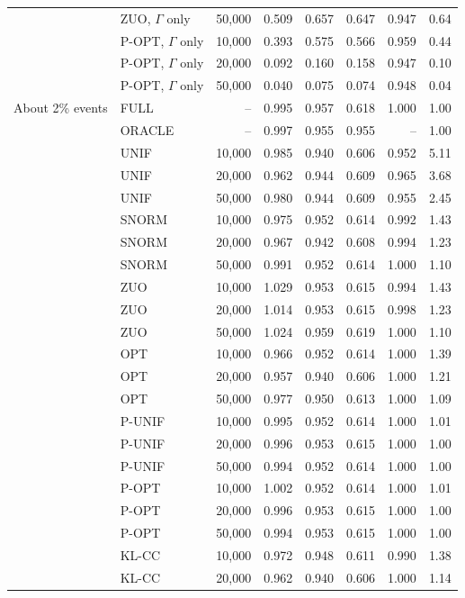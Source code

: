 \begin{tabular}{llrrrrrr}
 & ZUO, \(\Gamma\) only & 50,000 & 0.509 & 0.657 & 0.647 & 0.947 & 0.64\\
 & P-OPT, \(\Gamma\) only & 10,000 & 0.393 & 0.575 & 0.566 & 0.959 & 0.44\\
 & P-OPT, \(\Gamma\) only & 20,000 & 0.092 & 0.160 & 0.158 & 0.947 & 0.10\\
 & P-OPT, \(\Gamma\) only & 50,000 & 0.040 & 0.075 & 0.074 & 0.948 & 0.04\\
\addlinespace
About 2\% events & FULL & -- & 0.995 & 0.957 & 0.618 & 1.000 & 1.00\\
 & ORACLE & -- & 0.997 & 0.955 & 0.955 & -- & 1.00\\
 & UNIF & 10,000 & 0.985 & 0.940 & 0.606 & 0.952 & 5.11\\
 & UNIF & 20,000 & 0.962 & 0.944 & 0.609 & 0.965 & 3.68\\
 & UNIF & 50,000 & 0.980 & 0.944 & 0.609 & 0.955 & 2.45\\
 & SNORM & 10,000 & 0.975 & 0.952 & 0.614 & 0.992 & 1.43\\
 & SNORM & 20,000 & 0.967 & 0.942 & 0.608 & 0.994 & 1.23\\
 & SNORM & 50,000 & 0.991 & 0.952 & 0.614 & 1.000 & 1.10\\
 & ZUO & 10,000 & 1.029 & 0.953 & 0.615 & 0.994 & 1.43\\
 & ZUO & 20,000 & 1.014 & 0.953 & 0.615 & 0.998 & 1.23\\
 & ZUO & 50,000 & 1.024 & 0.959 & 0.619 & 1.000 & 1.10\\
 & OPT & 10,000 & 0.966 & 0.952 & 0.614 & 1.000 & 1.39\\
 & OPT & 20,000 & 0.957 & 0.940 & 0.606 & 1.000 & 1.21\\
 & OPT & 50,000 & 0.977 & 0.950 & 0.613 & 1.000 & 1.09\\
 & P-UNIF & 10,000 & 0.995 & 0.952 & 0.614 & 1.000 & 1.01\\
 & P-UNIF & 20,000 & 0.996 & 0.953 & 0.615 & 1.000 & 1.00\\
 & P-UNIF & 50,000 & 0.994 & 0.952 & 0.614 & 1.000 & 1.00\\
 & P-OPT & 10,000 & 1.002 & 0.952 & 0.614 & 1.000 & 1.01\\
 & P-OPT & 20,000 & 0.996 & 0.953 & 0.615 & 1.000 & 1.00\\
 & P-OPT & 50,000 & 0.994 & 0.953 & 0.615 & 1.000 & 1.00\\
 & KL-CC & 10,000 & 0.972 & 0.948 & 0.611 & 0.990 & 1.38\\
 & KL-CC & 20,000 & 0.962 & 0.940 & 0.606 & 1.000 & 1.14\\

\end{tabular}
